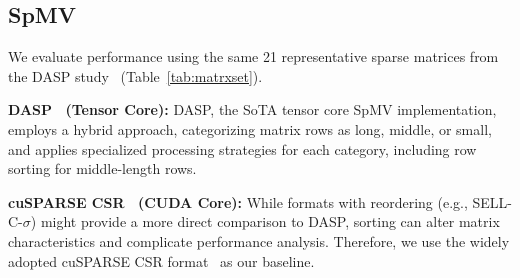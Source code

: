 \subsection{SpMV}

We evaluate performance using the same 21 representative sparse matrices from the DASP study~\cite{10.1145/3581784.3607051} (Table~\ref{tab:matrxset}).

\noindent\textbf{DASP~\cite{10.1145/3581784.3607051} (Tensor Core):} 
DASP, the SoTA tensor core SpMV implementation, employs a hybrid approach, categorizing matrix rows as long, middle, or small, and applies specialized processing strategies for each category, including row sorting for middle-length rows.

\noindent\textbf{cuSPARSE CSR~\cite{naumov2010cusparse} (CUDA Core):}
While formats with reordering (e.g., SELL-C-$\sigma$\cite{doi:10.1137/130930352}) might provide a more direct comparison to DASP, sorting can alter matrix characteristics and complicate performance analysis\cite{anzt2014implementing}. Therefore, we use the widely adopted cuSPARSE CSR format~\cite{naumov2010cusparse} as our baseline.






